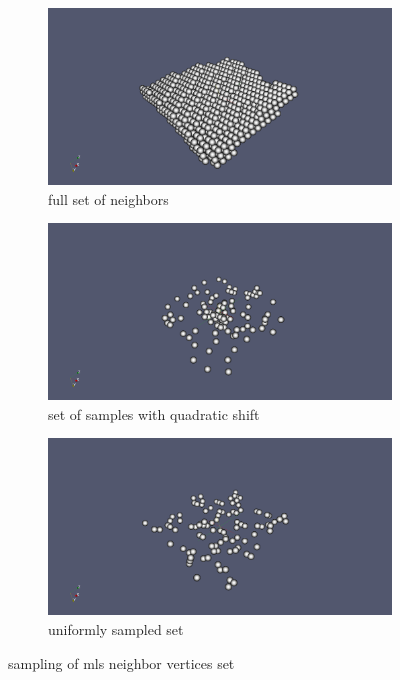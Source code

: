 \begin{figure}
	\begin{center}
		\begin{subfigure}[b]{0.9\textwidth}
			\includegraphics[width=\textwidth]{figures/SamplingFullDomain.png}
			\caption{full set of neighbors}
		\end{subfigure}
		\begin{subfigure}[b]{0.9\textwidth}
			\includegraphics[width=\textwidth]{figures/SamplingQuadratic.png}
			\caption{set of samples with quadratic shift}
		\end{subfigure}
		\begin{subfigure}[b]{0.9\textwidth}
			\includegraphics[width=\textwidth]{figures/SamplingUniform.png}
			\caption{uniformly sampled set}
		\end{subfigure}
	\end{center}
	\caption{sampling of mls neighbor vertices set} \label{fig:cluster_sampled}
\end{figure}
